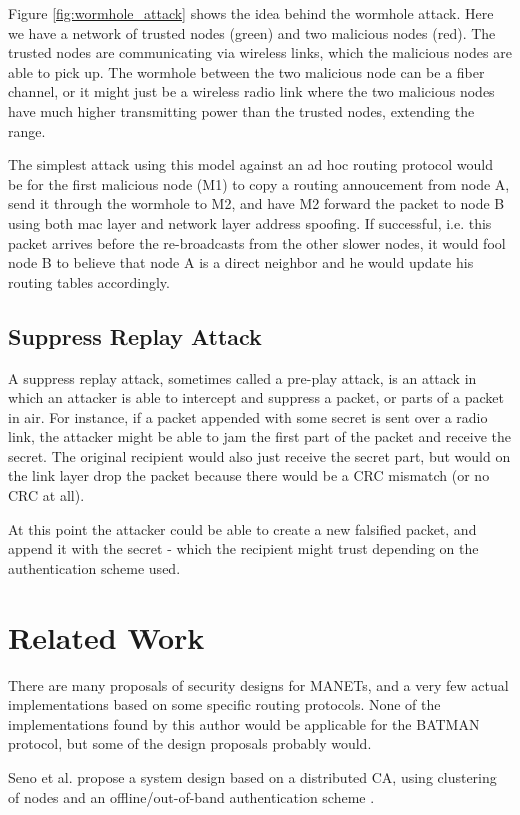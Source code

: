 Figure \ref{fig:wormhole_attack} shows the idea behind the wormhole attack. Here
we have a network of trusted nodes (green) and two malicious nodes (red). The
trusted nodes are communicating via wireless links, which the malicious nodes
are able to pick up. The wormhole between the two malicious node can be a fiber
channel, or it might just be a wireless radio link where the two malicious nodes
have much higher transmitting power than the trusted nodes, extending the range.

The simplest attack using this model against an ad hoc routing protocol would be
for the first malicious node (M1) to copy a routing annoucement from node A,
send it through the wormhole to M2, and have M2 forward the packet to node B
using both mac layer and network layer address spoofing. If successful, i.e.
this packet arrives before the re-broadcasts from the other slower nodes, it
would fool node B to believe that node A is a direct neighbor and he would
update his routing tables accordingly.

\subsection{Suppress Replay Attack}
A suppress replay attack, sometimes called a pre-play attack, is an attack in
which an attacker is able to intercept and suppress a packet, or parts of a
packet in air. For instance, if a packet appended with some secret is sent over
a radio link, the attacker might be able to jam the first part of the packet and
receive the secret. The original recipient would also just receive the secret
part, but would on the link layer drop the packet because there would be a
\ac{CRC} mismatch (or no \ac{CRC} at all).

At this point the attacker could be able to create a new falsified packet, and
append it with the secret - which the recipient might trust depending on the
authentication scheme used.

\section{Related Work}
There are many proposals of security designs for \acp{MANET}, and a very few
actual implementations based on some specific routing protocols. None of the
implementations found by this author would be applicable for the BATMAN
protocol, but some of the design proposals probably would.

Seno et al. propose a system design based on a distributed CA, using clustering
of nodes and an offline/out-of-band authentication scheme \cite{hosseinisecure}.

